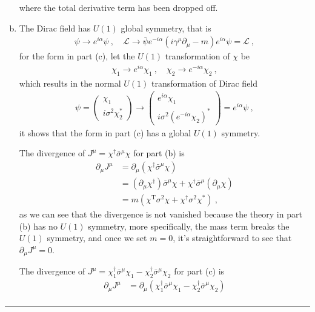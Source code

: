 \documentclass[12pt]{report}
\numberwithin{problemname}{chapter}
\newenvironment{solution}{\vspace{1em}\par\noindent{\large\textbf{\textsc{Solution}}}\par}{\vspace{1em}\hrule}
\begin{document}
\begin{solution}
\begin{enumerate}[(a)]
    where the total derivative term has been dropped off.
    \item The Dirac field has $U(1)$ global symmetry, that is
    \begin{align}
        \psi\to e^{i\alpha}\psi\ ,\quad\mathcal{L}\to\bar{\psi}e^{-i\alpha}(i\gamma^{\mu}\partial_{\mu}-m)e^{i\alpha}\psi=\mathcal{L}\ ,
    \end{align}
    for the form in part (c), let the $U(1)$ transformation of $\chi$ be
    \begin{align}
        \chi_1\to e^{i\alpha}\chi_1\ ,\quad \chi_2\to e^{-i\alpha}\chi_2\ ,
    \end{align}
    which results in the normal $U(1)$ transformation of Dirac field
    \begin{align}
        \psi=\begin{pmatrix}
          \chi_1 \\
          i\sigma^2\chi_2^*
        \end{pmatrix}
        \to\begin{pmatrix}
          e^{i\alpha}\chi_1 \\
          i\sigma^2(e^{-i\alpha}\chi_2)^*
        \end{pmatrix}
        =e^{i\alpha}\psi\ ,
    \end{align}
    it shows that the form in part (c) has a global $U(1)$ symmetry. \par
    The divergence of $J^{\mu}=\chi^{\dagger}\bar{\sigma}^{\mu}\chi$ for part (b) is
    \begin{align}
        \partial_{\mu}J^{\mu}&=\partial_{\mu}(\chi^{\dagger}\bar{\sigma}^{\mu}\chi) \nonumber \\
        &=(\partial_{\mu}\chi^{\dagger})\bar{\sigma}^{\mu}\chi+\chi^{\dagger}\bar{\sigma}^{\mu}(\partial_{\mu}\chi) \nonumber \\
        &=m(\chi^{\text{T}}\sigma^2\chi+\chi^{\dagger}\sigma^2\chi^*) \ ,
    \end{align}
    as we can see that the divergence is not vanished because the theory in part (b) has no $U(1)$ symmetry, more specifically, the mass term breaks the $U(1)$ symmetry, and once we set $m=0$, it's straightforward to see that $\partial_{\mu}J^{\mu}=0$. \par
    The divergence of $J^{\mu}=\chi_1^{\dagger}\bar{\sigma}^{\mu}\chi_1-\chi_2^{\dagger}\bar{\sigma}^{\mu}\chi_2$ for part (c) is
    \begin{align}
        \partial_{\mu}J^{\mu}&=\partial_{\mu}(\chi_1^{\dagger}\bar{\sigma}^{\mu}\chi_1-\chi_2^{\dagger}\bar{\sigma}^{\mu}\chi_2) \nonumber \\

\end{align}
\end{enumerate}
\end{solution}
\end{document}

